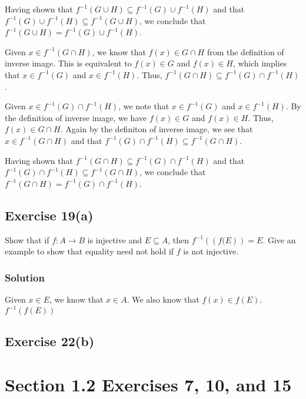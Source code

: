 \documentclass[12pt]{article}
\begin{document}
Having shown that $f^{-1}\left(G \cup H\right) \subseteq f^{-1}(G) \cup f^{-1}(H)$ and that $f^{-1}(G) \cup f^{-1}(H) \subseteq f^{-1}\left(G \cup H\right)$, we conclude that $f^{-1}\left(G \cup H\right) = f^{-1}(G) \cup f^{-1}(H)$.


Given $x \in f^{-1}\left(G \cap H\right)$, we know that $f\left(x\right) \in G \cap H$ from the definition of inverse image. This is equivalent to $f(x) \in G$ and $f(x) \in H$, which implies that $x \in f^{-1}(G)$ and $x \in f^{-1}(H)$. Thus, $f^{-1}\left(G \cap H\right) \subseteq f^{-1}(G) \cap f^{-1}(H)$.

Given $x \in f^{-1}(G) \cap f^{-1}(H)$, we note that $x \in f^{-1}(G)$ and $x \in f^{-1}(H)$. By the definition of inverse image, we have $f(x) \in G$ and $f(x) \in H$. Thus, $f(x) \in G \cap H$. Again by the definiton of inverse image, we see that $x \in f^{-1}\left(G \cap H\right)$ and that $f^{-1}(G) \cap f^{-1}(H) \subseteq f^{-1}\left(G \cap H\right)$.

Having shown that $f^{-1}\left(G \cap H\right) \subseteq f^{-1}(G) \cap f^{-1}(H)$ and that $f^{-1}(G) \cap f^{-1}(H) \subseteq f^{-1}\left(G \cap H\right)$, we conclude that $f^{-1}\left(G \cap H\right) = f^{-1}(G) \cap f^{-1}(H)$.

\subsection*{Exercise 19(a)}
Show that if $f : A \to B$ is injective and $E \subseteq A$, then $f^{-1}\left(\left(f(E\right)\right) = E$. Give an example to show that equality need not hold if $f$ is not injective.
\subsubsection*{Solution}
Given $x \in E$, we know that $x \in A$. We also know that $f(x) \in f(E)$. $f^{-1}\left(f\left(E\right)\right)$

\subsection*{Exercise 22(b)}

\section*{Section 1.2 Exercises 7, 10, and 15}
\end{document}
